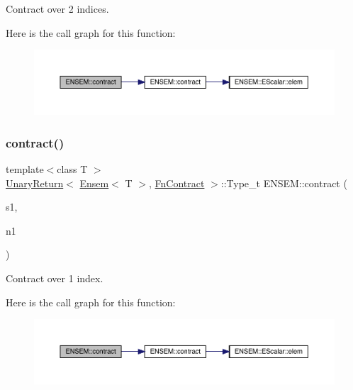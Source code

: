 Contract over 2 indices. 

Here is the call graph for this function\+:\nopagebreak
\begin{figure}[H]
\begin{center}
\leavevmode
\includegraphics[width=350pt]{d2/d94/namespaceENSEM_a370746f882b263d5a3925d4fae5c899b_cgraph}
\end{center}
\end{figure}
\mbox{\label{namespaceENSEM_ab2179c14714ad6831601c4da09e4de38}} 
\subsubsection{\texorpdfstring{contract()}{contract()}\hspace{0.1cm}{\footnotesize\ttfamily [3/4]}}
{\footnotesize\ttfamily template$<$class T $>$ \\
\mbox{\hyperlink{structENSEM_1_1UnaryReturn}{Unary\+Return}}$<$ \mbox{\hyperlink{classENSEM_1_1Ensem}{Ensem}}$<$ T $>$, \mbox{\hyperlink{structENSEM_1_1FnContract}{Fn\+Contract}} $>$\+::Type\+\_\+t E\+N\+S\+E\+M\+::contract (\begin{DoxyParamCaption}\item[{const \mbox{\hyperlink{classENSEM_1_1Ensem}{Ensem}}$<$ T $>$ \&}]{s1,  }\item[{int}]{n1 }\end{DoxyParamCaption})\hspace{0.3cm}{\ttfamily [inline]}}



Contract over 1 index. 

Here is the call graph for this function\+:\nopagebreak
\begin{figure}[H]
\begin{center}
\leavevmode
\includegraphics[width=350pt]{d2/d94/namespaceENSEM_ab2179c14714ad6831601c4da09e4de38_cgraph}
\end{center}
\end{figure}
\mbox{\label{namespaceENSEM_afcb2a43c3eaba0b5250358471ad25179}} 
